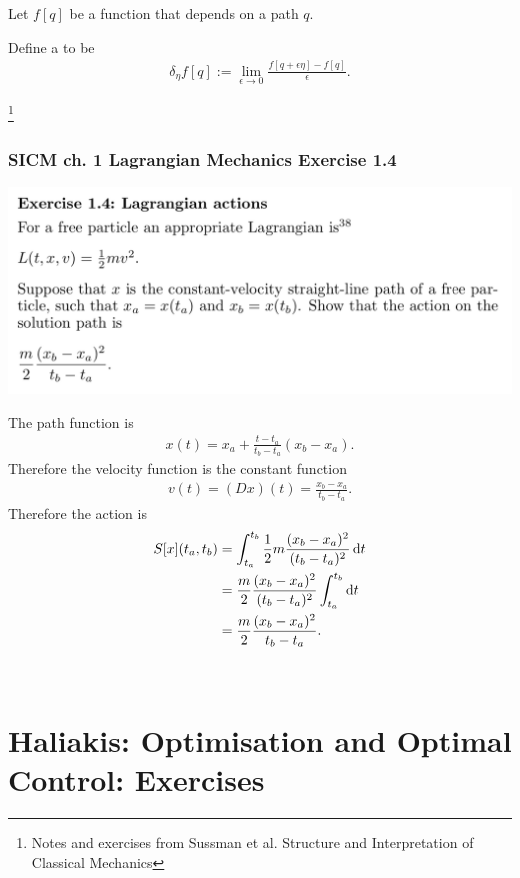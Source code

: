 Let $f[q]$ be a function that depends on a path $q$.

Define a  to be
\begin{align*}
  \delta_{\eta}f[q] := \lim_{\epsilon \to 0} \frac{f[q + \epsilon\eta] - f[q]}{\epsilon}.
\end{align*}

\newpage
\footnote{Notes and exercises from Sussman et al. Structure and Interpretation of Classical Mechanics}
\subsubsection*{SICM ch. 1 Lagrangian Mechanics Exercise 1.4}
\begin{mdframed}
  \includegraphics[width=400pt]{img/physics--classical-mechanics--sicm--1-4.png}
\end{mdframed}
The path function is
\begin{align*}
  x(t) = x_a + \frac{t - t_a}{t_b - t_a}(x_b - x_a).
\end{align*}
Therefore the velocity function is the constant function
\begin{align*}
  v(t) = (D x)(t) = \frac{x_b - x_a}{t_b - t_a}.
\end{align*}
Therefore the action is
\begin{align*}
  S[x](t_a, t_b) &= \int_{t_a}^{t_b}  \frac{1}{2}m \frac{(x_b - x_a)^2}{(t_b - t_a)^2} \d t \\
                 &= \frac{m}{2} \frac{(x_b - x_a)^2}{(t_b - t_a)^2}\int_{t_a}^{t_b} \d t \\
                 &= \frac{m}{2} \frac{(x_b - x_a)^2}{t_b - t_a}.
\end{align*}

$$

\section{Haliakis: Optimisation and Optimal Control: Exercises}
